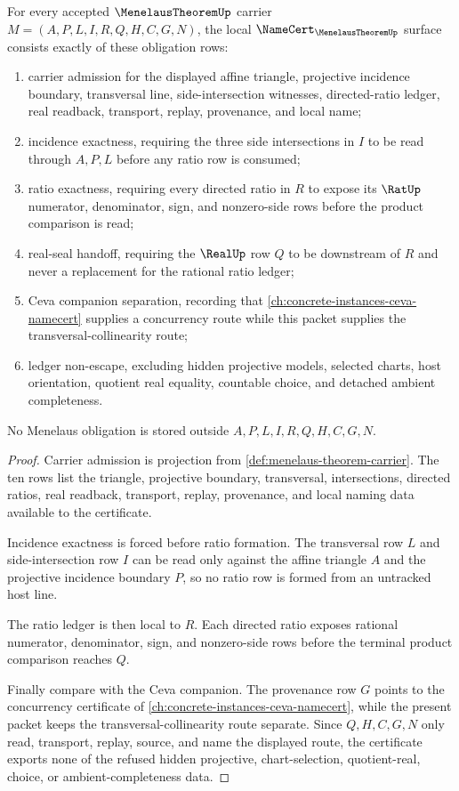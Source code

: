 \begin{theorem}
\label{thm:menelaus-theorem-namecert-obligations}
For every accepted $\MenelausTheoremUp$ carrier $M=(A,P,L,I,R,Q,H,C,G,N)$, the local $\NameCert_{\MenelausTheoremUp}$ surface consists exactly of these obligation rows:
\begin{enumerate}
\item carrier admission for the displayed affine triangle, projective incidence boundary, transversal line, side-intersection witnesses, directed-ratio ledger, real readback, transport, replay, provenance, and local name;
\item incidence exactness, requiring the three side intersections in $I$ to be read through $A,P,L$ before any ratio row is consumed;
\item ratio exactness, requiring every directed ratio in $R$ to expose its $\RatUp$ numerator, denominator, sign, and nonzero-side rows before the product comparison is read;
\item real-seal handoff, requiring the $\RealUp$ row $Q$ to be downstream of $R$ and never a replacement for the rational ratio ledger;
\item Ceva companion separation, recording that \autoref{ch:concrete-instances-ceva-namecert} supplies a concurrency route while this packet supplies the transversal-collinearity route;
\item ledger non-escape, excluding hidden projective models, selected charts, host orientation, quotient real equality, countable choice, and detached ambient completeness.
\end{enumerate}
No Menelaus obligation is stored outside $A,P,L,I,R,Q,H,C,G,N$.
\end{theorem}
\begin{proof}
Carrier admission is projection from \autoref{def:menelaus-theorem-carrier}. The ten rows list the triangle, projective boundary, transversal, intersections, directed ratios, real readback, transport, replay, provenance, and local naming data available to the certificate.

Incidence exactness is forced before ratio formation. The transversal row $L$ and side-intersection row $I$ can be read only against the affine triangle $A$ and the projective incidence boundary $P$, so no ratio row is formed from an untracked host line.

The ratio ledger is then local to $R$. Each directed ratio exposes rational numerator, denominator, sign, and nonzero-side rows before the terminal product comparison reaches $Q$.

Finally compare with the Ceva companion. The provenance row $G$ points to the concurrency certificate of \autoref{ch:concrete-instances-ceva-namecert}, while the present packet keeps the transversal-collinearity route separate. Since $Q,H,C,G,N$ only read, transport, replay, source, and name the displayed route, the certificate exports none of the refused hidden projective, chart-selection, quotient-real, choice, or ambient-completeness data.
\end{proof}

